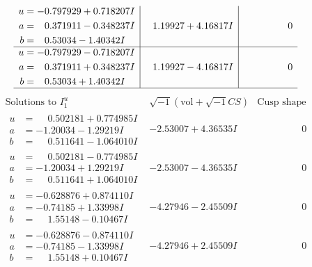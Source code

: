 \documentclass[1p]{elsarticle_modified}
\theoremstyle{definition}
\newcommand{\I}{\sqrt{-1}}
\begin{document}
$$\begin{array}{c|c|c}
\begin{aligned}
u &= -0.797929 + 0.718207 I \\
a &= \phantom{-}0.371911 - 0.348237 I \\
b &= \phantom{-}0.53034 - 1.40342 I\end{aligned}
 & \phantom{-}1.19927 + 4.16817 I & \phantom{-0.000000 } 0 \\ \hline\begin{aligned}
u &= -0.797929 - 0.718207 I \\
a &= \phantom{-}0.371911 + 0.348237 I \\
b &= \phantom{-}0.53034 + 1.40342 I\end{aligned}
 & \phantom{-}1.19927 - 4.16817 I & \phantom{-0.000000 } 0\\
 \hline 
 \end{array}$$\newpage$$\begin{array}{c|c|c}  
\text{Solutions to }I^u_{1}& \I (\text{vol} + \sqrt{-1}CS) & \text{Cusp shape}\\
 \hline 
\begin{aligned}
u &= \phantom{-}0.502181 + 0.774985 I \\
a &= -1.20034 - 1.29219 I \\
b &= \phantom{-}0.511641 - 1.064010 I\end{aligned}
 & -2.53007 + 4.36535 I & \phantom{-0.000000 } 0 \\ \hline\begin{aligned}
u &= \phantom{-}0.502181 - 0.774985 I \\
a &= -1.20034 + 1.29219 I \\
b &= \phantom{-}0.511641 + 1.064010 I\end{aligned}
 & -2.53007 - 4.36535 I & \phantom{-0.000000 } 0 \\ \hline\begin{aligned}
u &= -0.628876 + 0.874110 I \\
a &= -0.74185 + 1.33998 I \\
b &= \phantom{-}1.55148 - 0.10467 I\end{aligned}
 & -4.27946 - 2.45509 I & \phantom{-0.000000 } 0 \\ \hline\begin{aligned}
u &= -0.628876 - 0.874110 I \\
a &= -0.74185 - 1.33998 I \\
b &= \phantom{-}1.55148 + 0.10467 I\end{aligned}
 & -4.27946 + 2.45509 I & \phantom{-0.000000 } 0 \\ \hline\begin{aligned}

\end{aligned}
\end{array}$$
\end{document}
